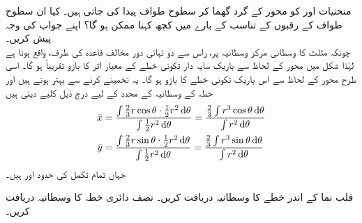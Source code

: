 منحنیات  اور   کو محور  کے گرد گھما کر سطوح طواف پیدا کی جاتی ہیں۔ کیا ان سطوح طواف کے رقبوں کے تناسب کے بارے میں کچھ کہنا ممکن ہو گا؟ اپنے جواب کی وجہ پیش کریں۔
\\
چونکہ مثلث کا وسطانی مرکز  وسطانیہ پر، راس سے دو تہائی دور مخالف قاعدہ کی طرف،  واقع ہوتا ہے لہٰذا شکل  میں محور  کے لحاظ سے باریک سایہ دار  تکونی خطے   کے معیار اثر     کا بازو تقریباً  ہو گا۔ اسی طرح محور  کے لحاظ سے  اس باریک تکونی خطے  کا بازو  ہو گا۔ یہ تخمینے    کرنے  سے بہتر ہوتے   ہیں اور   خطہ  کے وسطانیہ کے محدد کے لیے درج ذیل کلیے  دیتی ہیں
\begin{align*}
\bar{x}&=\frac{\int\frac{2}{3}r\cos\theta\cdot\frac{1}{2}r^2\dif\theta}{\int\frac{1}{2}r^2\dif\theta}=\frac{\frac{2}{3}\int r^3\cos\theta\dif\theta}{\int r^2\dif\theta}\\
\bar{y}&=\frac{\int\frac{2}{3}r\sin\theta\cdot\frac{1}{2}r^2\dif\theta}{\int\frac{1}{2}r^2\dif\theta}=\frac{\frac{2}{3}\int r^3\sin\theta\dif\theta}{\int r^2\dif\theta}
\end{align*}
جہاں تمام تکمل کی حدود  اور  ہیں۔

قلب نما  کے اندر خطے  کا وسطانیہ دریافت کریں۔
نصف دائری خطہ  کا وسطانیہ دریافت کریں۔ 



